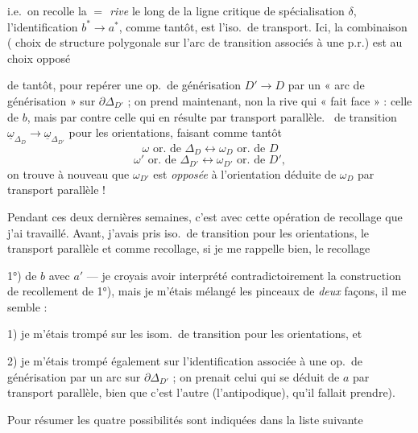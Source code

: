 \documentclass[11pt,a4paper]{article}
\begin{document}
i.e.\ on recolle  la \emph{$=$ rive} le long de la ligne critique de spécialisation $\delta$, l'identification $b^{*} \to a^{*}$, comme tantôt, est l'iso.\ de transport. Ici, la combinaison ( choix de structure polygonale sur l'arc de transition associés à une p.r.) est  au choix opposé

de tantôt, pour repérer une op.\ de générisation $D' \to D$ par un « arc de  générisation » sur $\partial\Delta_{D'}$ ; on prend maintenant, non la rive qui « fait face » : celle de $b$, mais par contre celle qui en résulte par transport parallèle.  \ de transition $\underline{\omega}_{\Delta_D} \to \underline{\omega}_{\Delta_{D'}}$ pour les orientations, faisant comme tantôt
\[
\omega \text{ or.\ de } \Delta_D \longleftrightarrow \omega_D \text{ or.\ de } D
\]
\[
\omega' \text{ or.\ de } \Delta_{D'} \longleftrightarrow \omega_{D'} \text{ or.\ de } D',
\]
on trouve à nouveau que $\omega_{D'}$ est \emph{opposée} à l'orientation  déduite de $\omega_D$ par transport parallèle !

Pendant ces deux dernières semaines, c'est avec cette opération de recollage que j'ai travaillé. Avant, j'avais pris \struck{\ill{}}  iso.\ de transition pour les orientations, le transport parallèle \struck{\ill{}} et comme \struck{\ill{}} recollage, si je me rappelle bien, le recollage

1°) de $b$ avec $a'$ --- je croyais avoir interprété contradictoirement la construction de recollement de 1°), mais je m'étais mélangé les pinceaux de \emph{deux} façons, il me semble :

1) je m'étais trompé sur les isom.\ de transition pour les orientations, et

2) je m'étais trompé également sur l'identification associée à une op.\ de générisation  par un arc sur $\partial\Delta_{D'}$ ; on prenait  celui qui  se déduit de $a$ par transport parallèle, bien que c'est l'autre  (l'antipodique), qu'il fallait prendre).

Pour résumer les quatre possibilités sont indiquées dans la liste suivante
\end{document}
